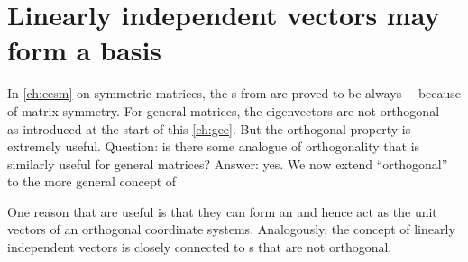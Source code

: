 
\section{Linearly independent vectors may form a basis}
\label{sec:lisb}

\secttoc

In \cref{ch:eesm} on symmetric matrices, the s from  are proved to be always ---because of matrix symmetry.  
For general matrices, the eigenvectors are not orthogonal---as introduced at the start of this \cref{ch:gee}.  
But the orthogonal property is extremely useful.
Question: is there some analogue of orthogonality that is similarly useful for general matrices?
Answer: yes. 
We now extend ``orthogonal'' to the more general concept of 

One reason that  are useful is that they can form an  and hence act as the unit vectors of an orthogonal coordinate systems.
Analogously, the concept of linearly independent vectors is closely connected to s that are not orthogonal.



